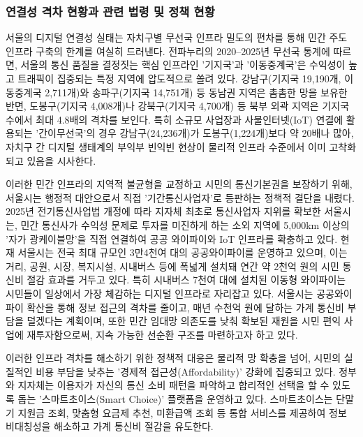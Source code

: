 \subsubsection{연결성 격차 현황과 관련 법령 및 정책 현황}
\label{subsubsec:2-2-2}

서울의 디지털 연결성 실태는 자치구별 무선국 인프라 밀도의 편차를 통해 민간 주도 인프라 구축의 한계를 여실히 드러낸다. 전파누리의 2020--2025년 무선국 통계에 따르면, 서울의 통신 품질을 결정짓는 핵심 인프라인 '기지국'과 '이동중계국'은 수익성이 높고 트래픽이 집중되는 특정 지역에 압도적으로 쏠려 있다. 강남구(기지국 19,190개, 이동중계국 2,711개)와 송파구(기지국 14,751개) 등 동남권 지역은 촘촘한 망을 보유한 반면, 도봉구(기지국 4,008개)나 강북구(기지국 4,700개) 등 북부 외곽 지역은 기지국 수에서 최대 4.8배의 격차를 보인다. 특히 소규모 사업장과 사물인터넷(IoT) 연결에 활용되는 '간이무선국'의 경우 강남구(24,236개)가 도봉구(1,224개)보다 약 20배나 많아, 자치구 간 디지털 생태계의 부익부 빈익빈 현상이 물리적 인프라 수준에서 이미 고착화되고 있음을 시사한다.


이러한 민간 인프라의 지역적 불균형을 교정하고 시민의 통신기본권을 보장하기 위해, 서울시는 행정적 대안으로서 직접 '기간통신사업자'로 등판하는 정책적 결단을 내렸다. 2025년 전기통신사업법 개정에 따라 지자체 최초로 통신사업자 지위를 확보한 서울시는, 민간 통신사가 수익성 문제로 투자를 미진하게 하는 소외 지역에 5,000km 이상의 '자가 광케이블망'을 직접 연결하여 공공 와이파이와 IoT 인프라를 확충하고 있다. 현재 서울시는 전국 최대 규모인 3만4천여 대의 공공와이파이를 운영하고 있으며, 이는 거리, 공원, 시장, 복지시설, 시내버스 등에 폭넓게 설치돼 연간 약 2천억 원의 시민 통신비 절감 효과를 거두고 있다. 특히 시내버스 7천여 대에 설치된 이동형 와이파이는 시민들이 일상에서 가장 체감하는 디지털 인프라로 자리잡고 있다. 서울시는 공공와이파이 확산을 통해 정보 접근의 격차를 줄이고, 매년 수천억 원에 달하는 가계 통신비 부담을 덜겠다는 계획이며, 또한 민간 임대망 의존도를 낮춰 확보된 재원을 시민 편익 사업에 재투자함으로써, 지속 가능한 선순환 구조를 마련하고자 하고 있다.

이러한 인프라 격차를 해소하기 위한 정책적 대응은 물리적 망 확충을 넘어, 시민의 실질적인 비용 부담을 낮추는 '경제적 접근성(Affordability)' 강화에 집중되고 있다. 정부와 지자체는 이용자가 자신의 통신 소비 패턴을 파악하고 합리적인 선택을 할 수 있도록 돕는 '스마트초이스(Smart Choice)' 플랫폼을 운영하고 있다. 스마트초이스는 단말기 지원금 조회, 맞춤형 요금제 추천, 미환급액 조회 등 통합 서비스를 제공하여 정보 비대칭성을 해소하고 가계 통신비 절감을 유도한다.

